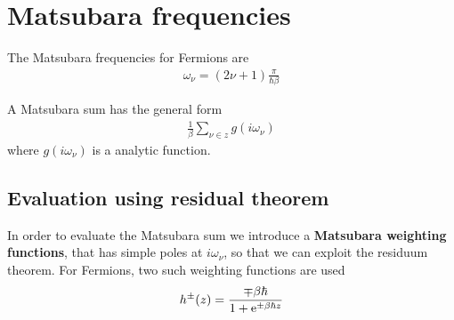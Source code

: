 \documentclass[11pt,a4paper]{report}
\begin{document}

\appendix
\chapter{Matsubara frequencies}
\label{app:matsubarafreq}

The Matsubara frequencies for Fermions are
\begin{eqnarray*}
\omega_\nu=(2\nu+1)\frac{\pi}{\hbar\beta}
\end{eqnarray*}

A Matsubara sum has the general form
\begin{eqnarray*}
\frac{1}{\beta}\sum_{\nu\in z} g(i\omega_\nu)
\end{eqnarray*}
where $g(i\omega_\nu)$ is a analytic function.

\section{Evaluation using residual theorem}
In order to evaluate the Matsubara sum we introduce a
\textbf{Matsubara weighting functions}, that has simple poles at $i\omega_\nu$, so that we can
exploit the residuum theorem. For Fermions, two such weighting
functions are used
\begin{eqnarray}
h^\pm(z)=\frac{\mp\beta\hbar}{1+\mathrm{e}^{\pm\beta\hbar z}}
\end{eqnarray}
\end{document}
